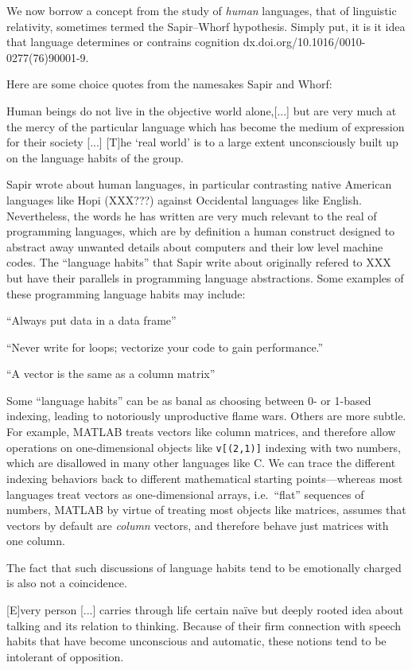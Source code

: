 \documentclass{article}
\begin{document}
We now borrow a concept from the study of \textit{human} languages, that
of linguistic relativity, sometimes termed the Sapir--Whorf hypothesis.
Simply put, it is it idea that language determines or contrains cognition
dx.doi.org/10.1016/0010-0277(76)90001-9.

Here are some choice quotes from the namesakes Sapir and Whorf:

Human beings do not live in the objective world alone,[...] but are very much at
the mercy of the particular language which has become the medium of expression
for their society [...] [T]he `real world' is to a large extent unconsciously
built up on the language habits of the group.~\cite{Sapir1929}


Sapir wrote about human languages, in particular contrasting native American
languages like Hopi (XXX???) against Occidental languages like English. Nevertheless,
the words he has written are very much relevant to the real of programming
languages, which are by definition a human construct designed to abstract away
unwanted details about computers and their low level machine codes.
The ``language habits'' that Sapir write about originally refered to XXX
but have their parallels in programming language abstractions. Some examples of
these programming language habits may include:

``Always put data in a data frame''

``Never write for loops; vectorize your code to gain performance.''

``A vector is the same as a column matrix''

Some ``language habits'' can be as banal as choosing between 0- or 1-based
indexing, leading to notoriously unproductive flame wars.
Others are more subtle. For example, MATLAB treats vectors like column matrices,
and therefore allow operations on one-dimensional objects like
\lstinline|v[(2,1)]| indexing with two numbers, which are disallowed
in many other languages like C. We can trace the different indexing behaviors
back to different mathematical starting points---whereas most languages treat
vectors as one-dimensional arrays, i.e.\ ``flat'' sequences of numbers, MATLAB
by virtue of treating most objects like matrices, assumes that vectors by default
are \textit{column} vectors, and therefore behave just matrices with one column.

The fact that such discussions of language habits tend to be emotionally
charged is also not a coincidence.

[E]very person [...] carries through life certain na\"ive but deeply rooted
idea about talking and its relation to thinking. Because of their firm
connection with speech habits that have become unconscious and automatic, these
notions tend to be intolerant of opposition.~\cite{Whorf1956sl}
\end{document}
